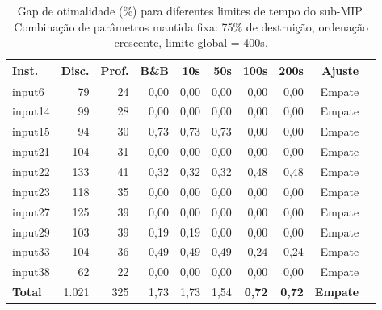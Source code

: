 \begin{table}[htbp]
\centering
\caption{Gap de otimalidade (\%) para diferentes limites de tempo do sub-MIP. Combinação de parâmetros mantida fixa: 75\% de destruição, ordenação crescente, limite global = 400s.}
\label{tab:lns_time_gap}
\small
\begin{tabular}{@{}lrrrrrrrrr@{}}
\toprule
\textbf{Inst.} & \textbf{Disc.} & \textbf{Prof.} & \textbf{B\&B} & \textbf{10s} & \textbf{50s} & \textbf{100s} & \textbf{200s} & \textbf{Ajuste} \\
\midrule
input6  & 79  & 24 & 0,00 & 0,00 & 0,00 & 0,00 & 0,00 & Empate \\
input14 & 99  & 28 & 0,00 & 0,00 & 0,00 & 0,00 & 0,00 & Empate \\
input15 & 94  & 30 & 0,73 & 0,73 & 0,73 & 0,00 & 0,00 & Empate \\
input21 & 104 & 31 & 0,00 & 0,00 & 0,00 & 0,00 & 0,00 & Empate \\
input22 & 133 & 41 & 0,32 & 0,32 & 0,32 & 0,48 & 0,48 & Empate \\
input23 & 118 & 35 & 0,00 & 0,00 & 0,00 & 0,00 & 0,00 & Empate \\
input27 & 125 & 39 & 0,00 & 0,00 & 0,00 & 0,00 & 0,00 & Empate \\
input29 & 103 & 39 & 0,19 & 0,19 & 0,00 & 0,00 & 0,00 & Empate \\
input33 & 104 & 36 & 0,49 & 0,49 & 0,49 & 0,24 & 0,24 & Empate \\
input38 & 62  & 22 & 0,00 & 0,00 & 0,00 & 0,00 & 0,00 & Empate \\
\midrule
\textbf{Total} & 1.021 & 325 & 1,73 & 1,73 & 1,54 & \textbf{0,72} & \textbf{0,72} & \textbf{Empate} \\
\bottomrule
\end{tabular}
\end{table}
